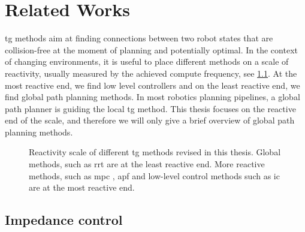 \chapter{Related Works} %
\label{cha:state}





\newpage


\Acl{tg} methods aim at finding connections between two
robot states
that are collision-free at the
moment of planning and potentially optimal.
In the context of changing environments, 
it is useful to place different methods
on a scale of reactivity, usually measured by the achieved
compute frequency, see \cref{fig:reactivity_scale}.
At the most reactive end, we find low
level controllers and on the least reactive end, we find
global path planning methods. In most robotics planning
pipelines, a global path planner is guiding the local
\ac{tg} method.
This thesis focuses on the reactive end of the scale, and
therefore we will only give a brief overview of global path
planning methods. 
%
\begin{figure}[h]
  \centering
  
  \caption{Reactivity scale of different \ac{tg} methods
  revised in this thesis. Global methods, such as \ac{rrt}
  \cite{Karaman2011} are at the least reactive end. More
  reactive methods, such as \ac{mpc}
  \cite{hewing2020learning}, \ac{apf} \cite{Khatib1985} and
  low-level control methods such as \ac{ic} \cite{hogan1985impedance}
  are at the most reactive end.}
  \label{fig:reactivity_scale}
\end{figure}

\section{Impedance control}%
\label{sec:impedance_control}

